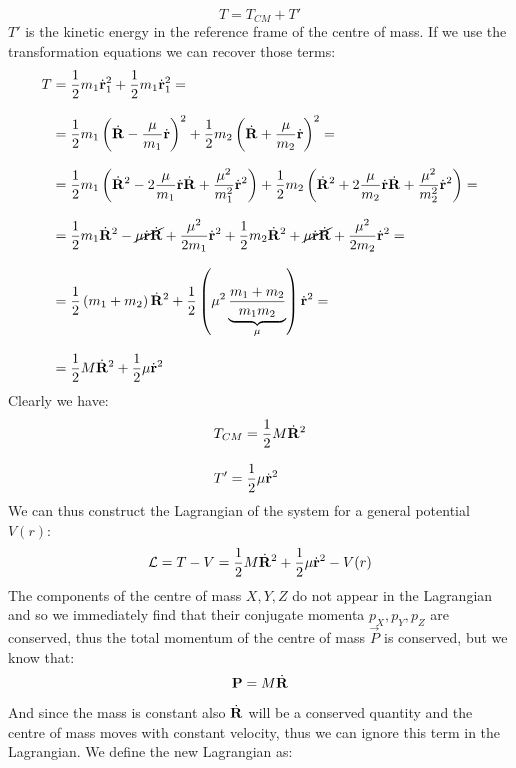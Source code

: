 \begin{equation}
  T = T_{CM} + T'
\end{equation}
$T'$ is the kinetic energy in the reference frame of the centre of mass. If we use the transformation equations we can recover those terms:
\begin{equation}
  \begin{split}
    T &= \dfrac{1}{2}m_1\dot{\vb{r}}_1^2 + \dfrac{1}{2}m_1\dot{\vb{r}}_1^2 = \\[8pt]
    &= \dfrac{1}{2}m_1\left(\dot{\vb{R}} - \dfrac{\mu}{m_1}\dot{\vb{r}}\right)^2 + \dfrac{1}{2}m_2\left(\dot{\vb{R}} + \dfrac{\mu}{m_2}\dot{\vb{r}}\right)^2 = \\[8pt]
    &= \dfrac{1}{2}m_1\left(\dot{\vb{R}}^2 - 2\dfrac{\mu}{m_1}\dot{\vb{r}}\dot{\vb{R}} + \dfrac{\mu^2}{m_1^2}\dot{\vb{r}}^2\right) + \dfrac{1}{2}m_2\left(\dot{\vb{R}}^2 + 2\dfrac{\mu}{m_2}\dot{\vb{r}}\dot{\vb{R}} + \dfrac{\mu^2}{m_2^2}\dot{\vb{r}}^2\right) = \\[8pt]
    &= \dfrac{1}{2}m_1\dot{\vb{R}}^2 - \cancel{\mu\dot{\vb{r}}\dot{\vb{R}}} + \dfrac{\mu^2}{2m_1}\dot{\vb{r}}^2 + \dfrac{1}{2}m_2\dot{\vb{R}}^2 + \cancel{\mu \dot{\vb{r}}\dot{\vb{R}}} + \dfrac{\mu^2}{2m_2}\dot{\vb{r}}^2 = \\[8pt]
    &= \dfrac{1}{2}\left(m_1 + m_2\right)\dot{\vb{R}}^2 + \dfrac{1}{2}\left(\mu^2\underbrace{\dfrac{m_1 + m_2}{m_1m_2}}_{\mu}\right)\dot{\vb{r}}^2 = \\[8pt]
    &= \dfrac{1}{2}M\dot{\vb{R}}^2 + \dfrac{1}{2}\mu\dot{\vb{r}}^2
  \end{split}
\end{equation}
Clearly we have:
\begin{equation}
  \begin{split}
    &T_{CM} = \dfrac{1}{2}M\dot{\vb{R}}^2 \\[8pt]
    &T' = \dfrac{1}{2}\mu\dot{\vb{r}}^2
  \end{split}
\end{equation}
We can thus construct the Lagrangian of the system for a general potential $V(r)$:
\begin{equation}
  \mathcal{L} = T - V = \dfrac{1}{2}M\dot{\vb{R}}^2 + \dfrac{1}{2}\mu\dot{\vb{r}}^2 - V(r)
\end{equation}
The components of the centre of mass $X, Y, Z$ do not appear in the Lagrangian and so we immediately find that their conjugate momenta $p_X, p_Y, p_Z$ are conserved, thus the total momentum of the centre of mass $\vec{P}$ is conserved, but we know that:
\begin{equation}
  \vb{P} = M\dot{\vb{R}}
\end{equation}
And since the mass is constant also $\dot{\vb{R}}$ will be a conserved quantity and the centre of mass moves with constant velocity, thus we can ignore this term in the Lagrangian. We define the new Lagrangian as:
